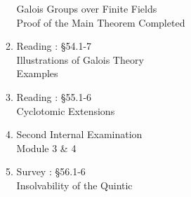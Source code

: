 \begin{enumerate}[label=Week \arabic*]
\begin{enumerate}[label=Day \arabic*]
			Galois Groups over Finite Fields\\
			Proof of the Main Theorem Completed
		\item Reading : \S54.1-7\\
			Illustrations of Galois Theory\\
			Examples
		\item Reading : \S55.1-6\\
			Cyclotomic Extensions
		\item Second Internal Examination\\
			Module 3 \& 4
		\item Survey : \S56.1-6\\
			Insolvability of the Quintic
	\end{enumerate}
\end{enumerate}
